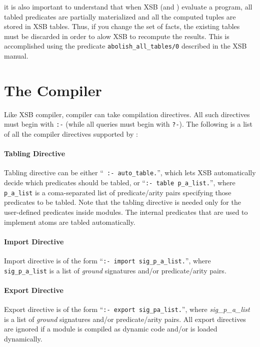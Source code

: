 \documentclass[11pt]{report}
\begin{document}
it is also important to understand that when XSB (and \FLORA) evaluate a
program, all tabled predicates are partially materialized and all the
computed tuples are stored in XSB tables. Thus, if you change the set of
facts, the existing tables must be discarded in order to alow XSB to
recompute the results. This is accomplished using the predicate
{\tt abolish\_all\_tables/0} described in the XSB manual.



\section{The \FLORA Compiler} \label{sec-comp-directives}

Like XSB compiler, \FLORA compiler can take compilation directives. All
such directives must begin with {\tt :-} (while all queries must begin with
{\tt ?-}). The following is a list of all the compiler directives supported
by \FLORA:

\paragraph{Tabling Directive} Tabling directive can be either ``{\tt
  :- auto\_table.}'', which lets XSB automatically decide which predicates
should be tabled, or ``{\tt :- table p\_a\_list.}'', where {\tt p\_a\_list}
is a coma-separated list of \mbox{predicate/arity} pairs specifying those
predicates to be tabled. Note that the tabling directive is needed only for
the user-defined predicates inside \FLORA modules. The internal \FLORA
predicates that are used to implement \fl atoms are tabled automatically.

\paragraph{Import Directive} Import directive is of the form
``{\tt :- import sig\_p\_a\_list.}'', where {\tt sig\_p\_a\_list} is a
list of \emph{ground} \fl signatures \mbox{and/or} \mbox{predicate/arity}
pairs.

\paragraph{Export Directive} Export directive is of the form
``{\tt :- export sig\_pa\_list.}'', where \emph{sig\_p\_a\_list} is a list of
\emph{ground} \fl signatures \mbox{and/or} \mbox{predicate/arity} pairs.
All export directives are ignored if a \FLORA module is compiled as dynamic
code and/or is loaded dynamically.
\end{document}
